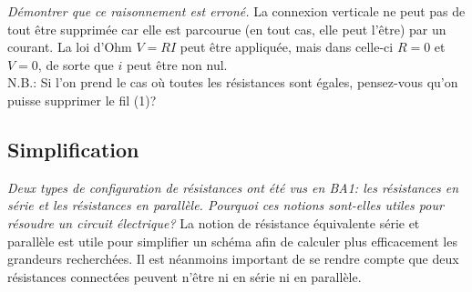 {\Question
{%
\textit{Démontrer que ce raisonnement est erroné.}
}
{%
La connexion verticale ne peut pas de tout être supprimée car elle est parcourue (en tout cas, elle peut l'être) par un courant. La loi d'Ohm $V=RI$ peut être appliquée, mais dans celle-ci $R=0$ et $V=0$, de sorte que $i$ peut être non nul.\\
N.B.: Si l'on prend le cas où toutes les résistances sont égales, pensez-vous qu'on puisse supprimer le fil (1)?
}

\subsection{Simplification}
\Question
{%
\textit{Deux types de configuration de résistances ont été vus en BA1: les résistances en série et les résistances en parallèle. Pourquoi ces notions sont-elles utiles pour résoudre un circuit électrique?}
}
{%
La notion de résistance équivalente série et parallèle est utile pour simplifier un schéma afin de calculer plus efficacement les grandeurs recherchées. Il est néanmoins important de se rendre compte que deux résistances connectées peuvent n'être ni en série ni en parallèle.
}

}
